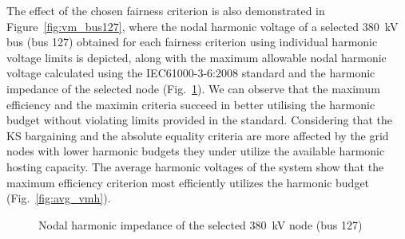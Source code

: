 The effect of the chosen fairness criterion is also demonstrated in Figure~\ref{fig:vm_bus127}, where the nodal harmonic voltage of a selected 380~kV bus (bus 127) obtained for each fairness criterion using individual harmonic voltage limits is depicted, along with the maximum allowable nodal harmonic voltage calculated using the IEC61000-3-6:2008 standard and the harmonic impedance of the selected node (Fig.~\ref{fig:zh_bus127}). We can observe that the maximum efficiency and the maximin criteria succeed in better utilising the harmonic budget without violating limits provided in the standard. Considering that the KS bargaining and the absolute equality criteria are more affected by the grid nodes with lower harmonic budgets they under utilize the available harmonic hosting capacity. The average harmonic voltages of the system show that the maximum efficiency criterion most efficiently utilizes the harmonic budget (Fig.~\ref{fig:avg_vmh}).

\begin{figure}[t]
    \centering
    \caption{Nodal harmonic impedance of the selected 380~kV node (bus 127)}
    \label{fig:zh_bus127}
\end{figure}

